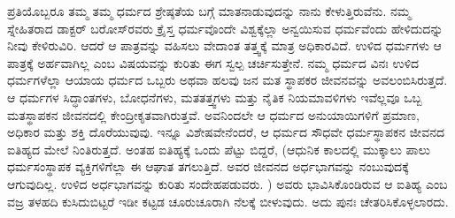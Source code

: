 ಪ್ರತಿಯೊಬ್ಬರೂ ತಮ್ಮ ತಮ್ಮ ಧರ್ಮದ ಶ್ರೇಷ್ಠತೆಯ ಬಗ್ಗೆ ಮಾತನಾಡುವುದನ್ನು ನಾನು ಕೇಳುತ್ತಿರುವೆನು. ನಮ್ಮ ಸ್ನೇಹಿತರಾದ ಡಾಕ್ಟರ್​ ಬರೋಸ್​ರವರು ಕ್ರೈಸ್ತ ಧರ್ಮವೊಂದೇ ವಿಶ್ವಕ್ಕೆಲ್ಲಾ ಅನ್ವಯಿಸುವ ಧರ್ಮವೆಂದು ಹೇಳಿದುದನ್ನು ನೀವು ಕೇಳಿರುವಿರಿ. ಆದರೆ ಆ ಪಾತ್ರವನ್ನು ವಹಿಸಲು ವೇದಾಂತ ತತ್ತ್ವಕ್ಕೆ ಮಾತ್ರ ಅಧಿಕಾರ\-ವಿದೆ. ಉಳಿದ ಧರ್ಮಗಳು ಆ ಪಾತ್ರಕ್ಕೆ ಅರ್ಹವಾಗಿಲ್ಲ ಎಂಬ ವಿಷಯವನ್ನು ಕುರಿತು ಈಗ ಸ್ವಲ್ಪ ಚರ್ಚಿಸುತ್ತೇನೆ. ನಮ್ಮ ಧರ್ಮದ ವಿನಃ ಉಳಿದ ಧರ್ಮಗಳೆಲ್ಲಾ ಆಯಾಯ ಧರ್ಮದ ಒಬ್ಬರು ಅಥವಾ ಹಲವು ಜನ ಮತ ಸ್ಥಾಪಕರ ಜೀವನವನ್ನು ಅವಲಂಬಿಸಿರುತ್ತದೆ. ಆ ಧರ್ಮಗಳ ಸಿದ್ಧಾಂತಗಳು, ಬೋಧನೆಗಳು, ಮತತತ್ತ್ವಗಳು ಮತ್ತು ನೈತಿಕ ನಿಯಮಾವಳಿಗಳು ಇವೆಲ್ಲವೂ ಒಬ್ಬ ಮತಸ್ಥಾಪಕನ ಜೀವನದಲ್ಲಿ ಕೇಂದ್ರೀಕೃತವಾಗಿರುತ್ತವೆ. ಅವನಿಂದಲೇ ಆ ಧರ್ಮದ ಅನುಯಾಯಿಗಳಿಗೆ ಪ್ರಮಾಣ, ಅಧಿಕಾರ ಮತ್ತು ಶಕ್ತಿ ದೊರೆಯುವುವು. ಇನ್ನೂ ವಿಶೇಷವೇನೆಂದರೆ, ಆ ಧರ್ಮದ ಸೌಧವೇ ಧರ್ಮಸ್ಥಾಪಕನ ಜೀವನದ ಐತಿಹ್ಯದ ಮೇಲೆ ನಿಂತಿರುತ್ತದೆ. ಅಂತಹ ಐತಿಹ್ಯಕ್ಕೆ ಒಂದು ಪೆಟ್ಟು ಬಿದ್ದರೆ, (ಆಧುನಿಕ ಕಾಲದಲ್ಲಿ ಮುಕ್ಕಾಲು ಪಾಲು ಧರ್ಮಸಂಸ್ಥಾಪಕ ವ್ಯಕ್ತಿಗಳಿಗೆಲ್ಲಾ ಈ ಆಘಾತ ತಗಲುತ್ತಿದೆ. ಅವರ ಜೀವನದ ಅರ್ಧಭಾಗವನ್ನು ನಂಬುವುದಕ್ಕೆ ಆಗುವುದಿಲ್ಲ. ಉಳಿದ ಅರ್ಧಭಾಗವನ್ನು ಕುರಿತು ಸಂದೇಹಪಡುವರು. ) ಅವರು ಭಾವಿಸಿಕೊಂಡಿರುವ ಆ ಐತಿಹ್ಯ ಎಂಬ ವಜ್ರ ತಳಹದಿ ಕುಸಿದುಬಿಟ್ಟರೆ ಇಡೀ ಕಟ್ಟಡ ಚೂರುಚೂರಾಗಿ ನೆಲಕ್ಕೆ ಬೀಳುವುದು. ಅದು ಪುನಃ ಚೇತರಿಸಿಕೊಳ್ಳಲಾರದು. 

